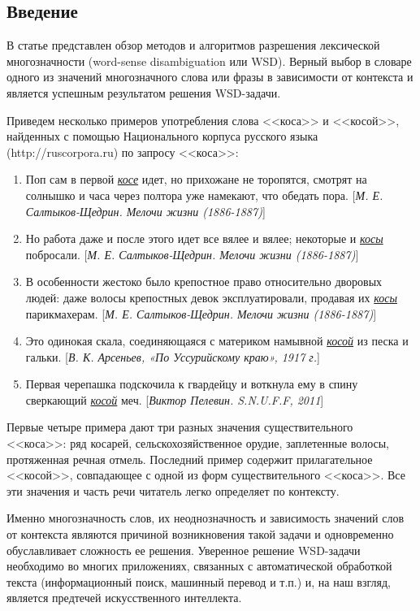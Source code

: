 \documentclass{article}
\begin{document}
\begin{articletext}

\section{Введение}
В статье представлен обзор методов и алгоритмов разрешения лексической многозначности (word-sense disambiguation или WSD). Верный выбор в словаре одного из значений многозначного слова или фразы в зависимости от контекста и является успешным результатом решения WSD-задачи.

Приведем несколько примеров употребления слова <<коса>> и <<косой>>, найденных с помощью Национального корпуса русского языка (http://ruscorpora.ru) по запросу <<коса>>:

\begin{enumerate}
\item Поп сам в первой \textit{\underline{косе}} идет, но прихожане не торопятся, смотрят на солнышко и часа через полтора уже намекают, что обедать пора. {\footnotesize[\textit{М. Е. Салтыков-Щедрин. Мелочи жизни (1886-1887)}]}
\item Но работа даже и после этого идет все вялее и вялее; некоторые и \textit{\underline{косы}} побросали. {\footnotesize[\textit{М. Е. Салтыков-Щедрин. Мелочи жизни (1886-1887)}]}
\item В особенности жестоко было крепостное право относительно дворовых людей: даже волосы крепостных девок эксплуатировали, продавая их \textit{\underline{косы}} парикмахерам. {\footnotesize[\textit{М. Е. Салтыков-Щедрин. Мелочи жизни (1886-1887)}]}
\item Это одинокая скала, соединяющаяся с материком намывной \textit{\underline{косой}} из песка и гальки. {\footnotesize[\textit{В. К. Арсеньев, «По Уссурийскому краю», 1917 г.}]}
\item Первая черепашка подскочила к гвардейцу и воткнула ему в спину сверкающий \textit{\underline{косой}} меч. {\footnotesize[\textit{Виктор Пелевин. S.N.U.F.F, 2011}]}
\end{enumerate}

Первые четыре примера дают три разных значения существительного <<коса>>: ряд косарей, сельскохозяйственное орудие, заплетенные волосы, протяженная речная отмель. Последний пример содержит прилагательное <<косой>>, совпадающее с одной из форм существительного <<коса>>. Все эти значения и часть речи читатель легко определяет по контексту. 

Именно многозначность слов, их неоднозначность и зависимость значений слов от контекста являются причиной возникновения такой задачи и одновременно обуславливает сложность ее решения. Уверенное решение WSD-задачи необходимо во многих приложениях, связанных с автоматической обработкой текста (информационный поиск, машинный перевод и т.п.) и, на наш взгляд, является предтечей искусственного интеллекта.


\end{articletext}
\end{document}
